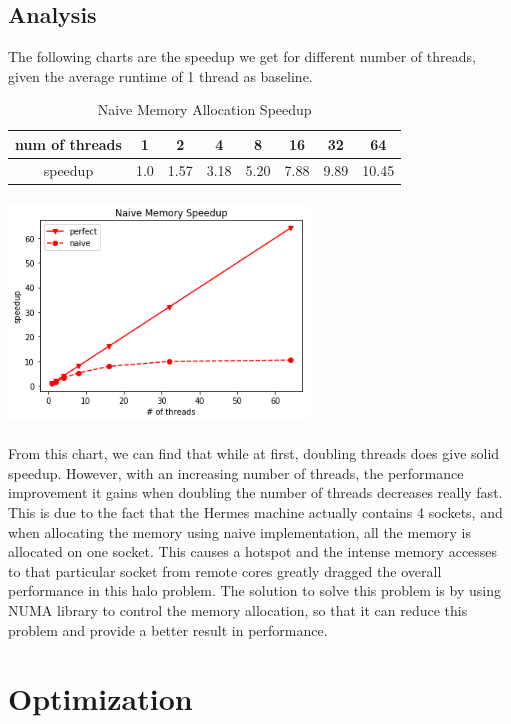 \documentclass{cs4444}
\begin{document}
\subsection{Analysis}
The following charts are the speedup we get for different number of threads, given the average runtime of 1 thread as baseline.

\begin{table}[ht]
\caption {Naive Memory Allocation Speedup}
\centering
\begin{tabular}{c c c c c c c c}
\hline\hline
num of threads & 1 & 2 & 4 & 8 & 16 & 32 & 64 \\
\hline
speedup & 1.0 & 1.57 & 3.18 & 5.20 & 7.88 & 9.89 & 10.45\\
\end{tabular}
\centering
\end{table}

\begin{center}
\includegraphics[width=8cm, height=6cm]{naive_memory}
\end{center}

From this chart, we can find that while at first, doubling threads does give solid speedup. However, with an increasing number of threads, the performance improvement it gains when doubling the number of threads decreases really fast. This is due to the fact that the Hermes machine actually contains 4 sockets, and when allocating the memory using naive implementation, all the memory is allocated on one socket. This causes a hotspot and the intense memory accesses to that particular socket from remote cores greatly dragged the overall performance in this halo problem. The solution to solve this problem is by using NUMA library to control the memory allocation, so that it can reduce this problem and provide a better result in performance. 

\section{Optimization}
\end{document}

